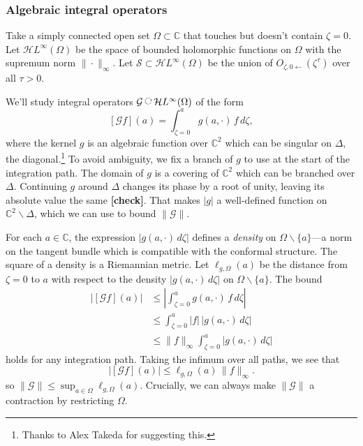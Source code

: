 \documentclass{article}
\theoremstyle{plain}
\newcommand{\acts}{\mathbin{\raisebox{\depth}{\rotatebox{-90}{$\circlearrowright$}}}}
\newcommand{\C}{\mathbb{C}}
\newcommand{\holoL}[1]{\mathcal{H}L^{#1}} %
\begin{document}
\color{DodgerBlue}
\subsubsection{Algebraic integral operators}
Take a simply connected open set $\Omega \subset \C$ that touches but doesn't contain $\zeta = 0$. Let $\holoL{\infty}(\Omega)$ be the space of bounded holomorphic functions on $\Omega$ with the supremum norm $\|\cdot\|_\infty$. Let $\mathcal{S} \subset \holoL{\infty}(\Omega)$ be the union of $O_{\zeta, 0 \leftarrow}(\zeta^\tau)$ over all $\tau > 0$.

We'll study integral operators $\mathcal{G} \acts \holoL{\infty}(\Omega)$ of the form
\[ [\mathcal{G}f](a) = \int_{\zeta = 0}^{a} g(a, \cdot)\,f\,d\zeta, \]
where the kernel $g$ is an algebraic function over $\C^2$ which can be singular on $\Delta$, the diagonal.\footnote{Thanks to Alex Takeda for suggesting this.} To avoid ambiguity, we fix a branch of $g$ to use at the start of the integration path. The domain of $g$ is a covering of $\C^2$ which can be branched over $\Delta$. Continuing $g$ around $\Delta$ changes its phase by a root of unity, leaving its absolute value the same \textbf{[check]}. That makes $|g|$ a well-defined function on $\C^2 \smallsetminus \Delta$, which we can use to bound $\|\mathcal{G}\|$.

For each $a \in \C$, the expression $|g(a, \cdot)\,d\zeta|$ defines a {\em density} on $\Omega \smallsetminus \{a\}$---a norm on the tangent bundle which is compatible with the conformal structure. The square of a density is a Riemannian metric. Let $\ell_{g, \Omega}(a)$ be the distance from $\zeta = 0$ to $a$ with respect to the density $|g(a, \cdot)\,d\zeta|$ on $\Omega \smallsetminus \{a\}$. The bound
\begin{align*}
\big|[\mathcal{G}f](a)\big| & \le \left| \int_{\zeta = 0}^{a} g(a, \cdot)\,f\,d\zeta \right| \\
& \le \int_{\zeta = 0}^{a} |f|\,|g(a, \cdot)\,d\zeta| \\
& \le \|f\|_\infty \int_{\zeta = 0}^{a} |g(a, \cdot)\,d\zeta|
\end{align*}
holds for any integration path. Taking the infimum over all paths, we see that
\[ \big|[\mathcal{G}f](a)\big| \le \ell_{g, \Omega}(a)\,\|f\|_\infty. \]
so $\|\mathcal{G}\| \le \sup_{a \in \Omega} \ell_{g, \Omega}(a)$. Crucially, we can always make $\|\mathcal{G}\|$ a contraction by restricting $\Omega$.
\end{document}
